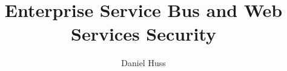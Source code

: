 \documentclass{llncs}
\begin{document}
\author{Daniel Huss}
\title{Enterprise Service Bus and Web Services Security}

\maketitle

\frontmatter%
\mainmatter%

%

\printindex
\end{document}
